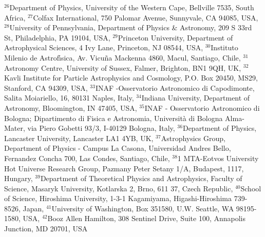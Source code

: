 {$^{26}$Department of Physics, University of the Western Cape, Bellville 7535, South Africa,
$^{27}$Colfax International, 750 Palomar Avenue, Sunnyvale, CA 94085, USA,
$^{28}$University of Pennsylvania, Department of Physics \& Astronomy, 209 S 33rd St, Philadelphia, PA 19104, USA,
$^{29}$Princeton University, Department of Astrophysical Sciences, 4 Ivy Lane, Princeton, NJ 08544, USA,
$^{30}$Instituto Milenio de Astrof\'\i sica, Av. Vicu{\~{n}}a Mackenna 4860, Macul, Santiago, Chile,
$^{31}$Astronomy Centre, University of Sussex, Falmer, Brighton, BN1 9QH, UK,
$^{32}$Kavli Institute for Particle Astrophysics and Cosmology, P.O. Box 20450, MS29, Stanford, CA 94309, USA,
$^{33}$INAF -Osservatorio Astronomico di Capodimonte, Salita Moiariello, 16, 80131 Naples, Italy, 
$^{34}$Indiana University, Department of Astronomy, Bloomington, IN 47405, USA,
$^{35}$INAF - Osservatorio Astronomico di Bologna; Dipartimento di Fisica e Astronomia, Universit\`a di Bologna Alma-Mater, via Piero Gobetti 93/3, I-40129 Bologna, Italy,
$^{36}$Department of Physics, Lancaster University, Lancaster LA1 4YB, UK,
$^{37}$Astrophysics Group, Department of Physics - Campus La Casona, Universidad Andres Bello, Fernandez Concha 700, Las Condes,  Santiago, Chile,
$^{38}$1 MTA-Eotvos University Hot Universe Research Group, Pazmany Peter Setany 1/A, Budapest, 1117, Hungary,
$^{39}$Department of Theoretical Physics and Astrophysics, Faculty of Science, Masaryk University, Kotlarska 2, Brno, 611 37, Czech Republic,
$^{40}$School of Science, Hiroshima University, 1-3-1 Kagamiyama, Higashi-Hiroshima 739-8526, Japan,
$^{41}$University of Washington, Box 351580, U.W. Seattle, WA 98195-1580, USA,
$^{42}$Booz Allen Hamilton, 308 Sentinel Drive, Suite 100, Annapolis Junction, MD 20701, USA







}
